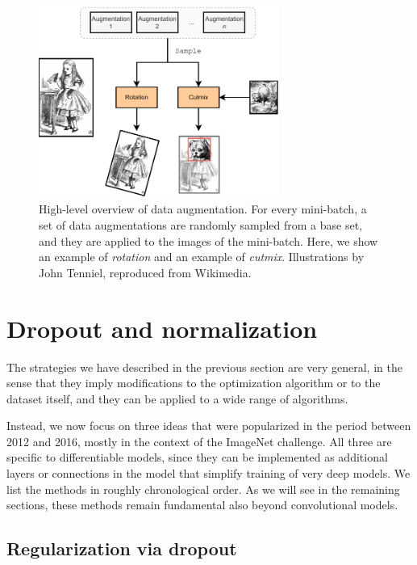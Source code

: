 \begin{figure}[t]
    \centering
    \includegraphics[width=0.7\textwidth]{images/data_augmentation}
    \caption{High-level overview of data augmentation. For every mini-batch, a set of data augmentations are randomly sampled from a base set, and they are applied to the images of the mini-batch. Here, we show an example of \textit{rotation} and an example of \textit{cutmix}. Illustrations by John Tenniel, reproduced from Wikimedia.}
    \label{fig:cutmix}
\end{figure}

\section{Dropout and normalization}

The strategies we have described in the previous section are very general, in the sense that they imply modifications to the optimization algorithm or to the dataset itself, and they can be applied to a wide range of algorithms. 

Instead, we now focus on three ideas that were popularized in the period between 2012 and 2016, mostly in the context of the ImageNet challenge. All three are specific to differentiable models, since they can be implemented as additional layers or connections in the model that simplify training of very deep models. We list the methods in roughly chronological order. As we will see in the remaining sections, these methods remain fundamental also beyond convolutional models.

\subsection{Regularization via dropout}
\label{subsec:dropout}

